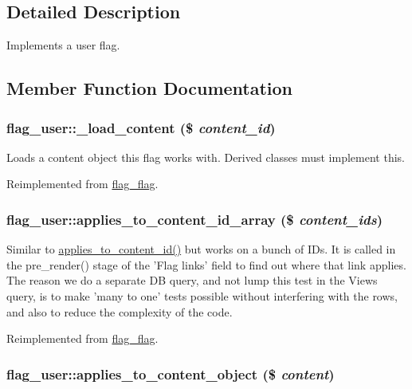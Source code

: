 \subsection{Detailed Description}
Implements a user flag. 

\subsection{Member Function Documentation}
\hypertarget{classflag__user_93152c6302f304279dba89e4b81af658}{
\subsubsection[{\_\-load\_\-content}]{\setlength{\rightskip}{0pt plus 5cm}flag\_\-user::\_\-load\_\-content (\$ {\em content\_\-id})}}
\label{classflag__user_93152c6302f304279dba89e4b81af658}


Loads a content object this flag works with. Derived classes must implement this.

Reimplemented from \hyperlink{classflag__flag}{flag\_\-flag}.\hypertarget{classflag__user_0ccc7caff183a9e9067d49a89917c003}{
\subsubsection[{applies\_\-to\_\-content\_\-id\_\-array}]{\setlength{\rightskip}{0pt plus 5cm}flag\_\-user::applies\_\-to\_\-content\_\-id\_\-array (\$ {\em content\_\-ids})}}
\label{classflag__user_0ccc7caff183a9e9067d49a89917c003}


Similar to \hyperlink{classflag__flag_a38afcc59d7d1ef028215521c6fcdc22}{applies\_\-to\_\-content\_\-id()} but works on a bunch of IDs. It is called in the pre\_\-render() stage of the 'Flag links' field to find out where that link applies. The reason we do a separate DB query, and not lump this test in the Views query, is to make 'many to one' tests possible without interfering with the rows, and also to reduce the complexity of the code. 

Reimplemented from \hyperlink{group__views_g7ffe2653803be84d2c2d21dea608a6da}{flag\_\-flag}.\hypertarget{classflag__user_1166b6c58dbd8074dd5187f3c5b84c8b}{
\subsubsection[{applies\_\-to\_\-content\_\-object}]{\setlength{\rightskip}{0pt plus 5cm}flag\_\-user::applies\_\-to\_\-content\_\-object (\$ {\em content})}}
\label{classflag__user_1166b6c58dbd8074dd5187f3c5b84c8b}


